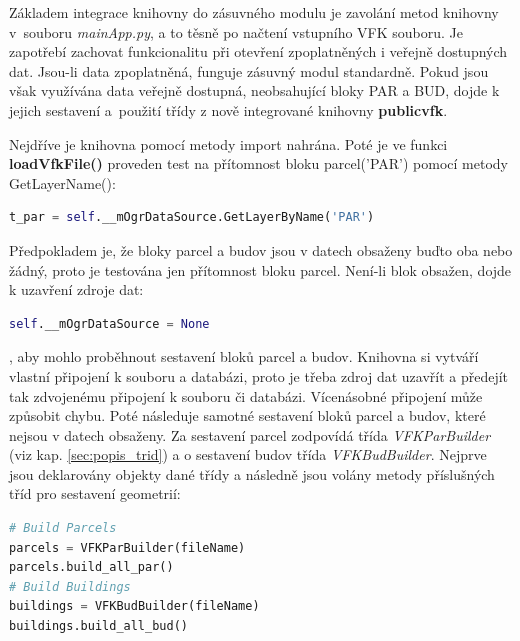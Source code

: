 Základem integrace knihovny do zásuvného modulu je zavolání metod
knihovny v~souboru \textit{mainApp.py}, a to těsně po načtení
vstupního VFK souboru. Je zapotřebí zachovat
funkcionalitu při otevření zpoplatněných i veřejně dostupných
dat. Jsou-li data zpoplatněná, funguje zásuvný modul standardně. Pokud
jsou však využívána data veřejně dostupná,
neobsahující bloky PAR a BUD, dojde k jejich sestavení a~použití
třídy z nově integrované knihovny \textbf{publicvfk}.

Nejdříve je knihovna pomocí metody import nahrána. Poté je ve funkci
\textbf{loadVfkFile()} proveden test na přítomnost bloku parcel('PAR')
pomocí metody GetLayerName():
\begin{lstlisting}[language=Python, numbers=none]
t_par = self.__mOgrDataSource.GetLayerByName('PAR')
\end{lstlisting}
Předpokladem je, že bloky parcel a budov jsou v datech obsaženy buďto oba nebo žádný, proto je testována jen přítomnost bloku parcel. Není-li blok obsažen, dojde k uzavření zdroje dat:
\begin{lstlisting}[language=Python, numbers=none]
self.__mOgrDataSource = None
\end{lstlisting}
, aby mohlo proběhnout sestavení bloků parcel a budov. Knihovna si
vytváří vlastní připojení k  souboru a databázi, proto je
třeba zdroj dat uzavřít a předejít tak zdvojenému připojení k 
souboru či databázi. Vícenásobné připojení může způsobit chybu. Poté
následuje samotné sestavení bloků parcel a budov, které nejsou v datech obsaženy. Za
sestavení parcel zodpovídá třída \textit{VFKParBuilder} (viz
kap. \ref{sec:popis_trid}) a o sestavení
budov třída \textit{VFKBudBuilder}. Nejprve jsou deklarovány objekty dané třídy a následně jsou
volány metody příslušných tříd pro sestavení geometrií:

\begin{lstlisting}[language=Python, numbers=none]
# Build Parcels
parcels = VFKParBuilder(fileName)
parcels.build_all_par()
# Build Buildings
buildings = VFKBudBuilder(fileName)
buildings.build_all_bud()
\end{lstlisting}

